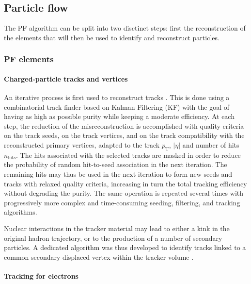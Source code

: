 \subsection{Particle flow}
\label{sec:pf}

The PF algorithm can be split into two disctinct steps: first the reconstruction of the elements that will then be used to identify and reconstruct particles.

\subsubsection{PF elements}

\paragraph{Charged-particle tracks and vertices}
An iterative process is first used to reconstruct tracks \cite{Collaboration_2014}. This is done using a combinatorial track finder based on Kalman Filtering (KF) with the goal of having as high as possible purity while keeping a moderate efficiency. At each step, the reduction of the misreconstruction is accomplished with quality criteria on the track seeds, on the track vertices, and on the track compatibility with the reconstructed primary vertices, adapted to the track $p_{\mathrm{T}}$, $|\eta|$ and number of hits $n_{\mathrm{hits}}$. The hits associated with the selected tracks are masked in order to reduce the probability of random hit-to-seed association in the next iteration. The remaining hits may thus be used in the next iteration to form new seeds and tracks with relaxed quality criteria, increasing in turn the total tracking efficiency without degrading the purity. The same operation is repeated several times with progressively more complex and time-consuming seeding, filtering, and tracking algorithms.

Nuclear interactions in the tracker material may lead to either a kink in the original hadron trajectory, or to the production of a number of secondary particles. A dedicated algorithm was thus developed to identify tracks linked to a common secondary displaced vertex within the tracker volume \cite{CMS-PAS-TRK-10-003,Khachatryan2010}.

\paragraph{Tracking for electrons}

